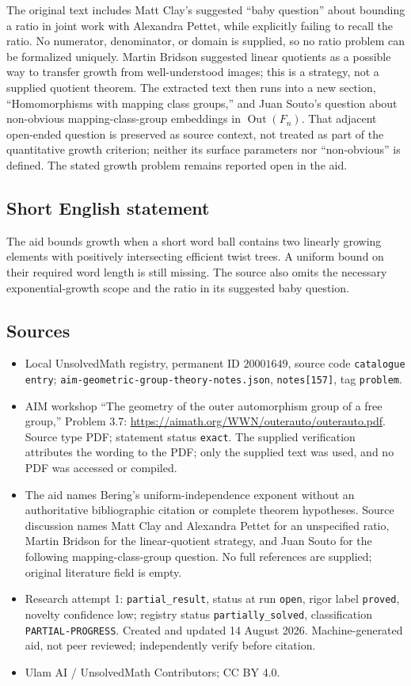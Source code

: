 \documentclass[11pt]{article}
\begin{document}
The original text includes Matt Clay's suggested ``baby question'' about bounding a ratio in joint work with Alexandra Pettet, while explicitly failing to recall the ratio. No numerator, denominator, or domain is supplied, so no ratio problem can be formalized uniquely. Martin Bridson suggested linear quotients as a possible way to transfer growth from well-understood images; this is a strategy, not a supplied quotient theorem. The extracted text then runs into a new section, ``Homomorphisms with mapping class groups,'' and Juan Souto's question about non-obvious mapping-class-group embeddings in \(\operatorname{Out}(F_n)\). That adjacent open-ended question is preserved as source context, not treated as part of the quantitative growth criterion; neither its surface parameters nor ``non-obvious'' is defined. The stated growth problem remains reported open in the aid.
\subsection{Short English statement}
The aid bounds growth when a short word ball contains two linearly growing elements with positively intersecting efficient twist trees. A uniform bound on their required word length is still missing. The source also omits the necessary exponential-growth scope and the ratio in its suggested baby question.
\subsection{Sources}
\begin{itemize}
\item Local UnsolvedMath registry, permanent ID \(20001649\), source code \texttt{catalogue entry}; \texttt{aim-geometric-group-theory-notes.json}, \texttt{notes[157]}, tag \texttt{problem}.
\item AIM workshop ``The geometry of the outer automorphism group of a free group,'' Problem 3.7: \url{https://aimath.org/WWN/outerauto/outerauto.pdf}. Source type PDF; statement status \texttt{exact}. The supplied verification attributes the wording to the PDF; only the supplied text was used, and no PDF was accessed or compiled.
\item The aid names Bering's uniform-independence exponent without an authoritative bibliographic citation or complete theorem hypotheses. Source discussion names Matt Clay and Alexandra Pettet for an unspecified ratio, Martin Bridson for the linear-quotient strategy, and Juan Souto for the following mapping-class-group question. No full references are supplied; original literature field is empty.
\item Research attempt 1: \texttt{partial\_result}, status at run \texttt{open}, rigor label \texttt{proved}, novelty confidence low; registry status \texttt{partially\_solved}, classification \texttt{PARTIAL-PROGRESS}. Created and updated 14 August 2026. Machine-generated aid, not peer reviewed; independently verify before citation.
\item Ulam AI / UnsolvedMath Contributors; CC BY 4.0.
\end{itemize}
\end{document}

